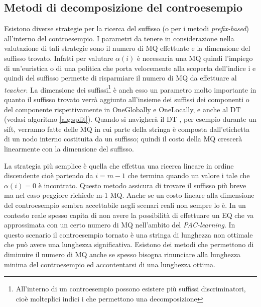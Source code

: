 \subsection[Metodi decomposizione controesempio]{Metodi di decomposizione del controesempio} Esistono diverse strategie per la ricerca del suffisso (o per i metodi \textit{prefix-based}) all'interno del controesempio. I parametri da tenere in considerazione nella valutazione di tali strategie sono il numero di \ac{MQ} effettuate e la dimensione del suffisso trovato. Infatti per valutare $\alpha(i)$ è necessaria una \ac{MQ} quindi l'impiego di un'euristica o di una politica che porta velocemente alla scoperta dell'indice i e quindi del suffisso permette di risparmiare il numero di \ac{MQ} da effettuare al \textit{teacher}. La dimensione dei suffissi\footnote{All'interno di un controesempio possono esistere più suffissi discriminatori, cioè molteplici indici i che permettono una decomposizione} è anch esso un parametro molto importante in quanto il suffisso trovato verrà aggiunto all'insieme dei suffissi dei componenti o del componente rispettivamente in OneGlobally e OneLocally, e anche al \ac{DT} (vedasi algoritmo \ref{alg:split}). Quando si navigherà il \ac{DT} , per esempio durante un sift, verranno fatte delle \ac{MQ} in cui parte della stringa è composta dall'etichetta di un nodo interno costituita da un suffisso; quindi il costo della \ac{MQ} crescerà linearmente con la dimensione del suffisso.

La strategia più semplice è quella che effettua una ricerca lineare in ordine discendente cioè partendo da $i = m-1$ che termina quando un valore i tale che $\alpha(i)=0$ è incontrato. Questo metodo assicura di trovare il suffisso più breve ma nel caso peggiore richiede m-1 \ac{MQ}. Anche se un costo lineare alla dimensione del controesempio sembra accettabile negli scenari reali non sempre lo è. In un contesto reale spesso capita di non avere la possibilità di effettuare un \ac{EQ} che va approssimata con un certo numero di \ac{MQ} nell'ambito del \textit{PAC-learning}. In questo scenario il controesempio tornato è una stringa di lunghezza non ottimale che può avere una lunghezza significativa. Esistono dei metodi che permettono di diminuire il numero di \ac{MQ} anche se spesso bisogna rinunciare alla lunghezza minima del controesempio ed accontentarsi di una lunghezza ottima.

\noindent

